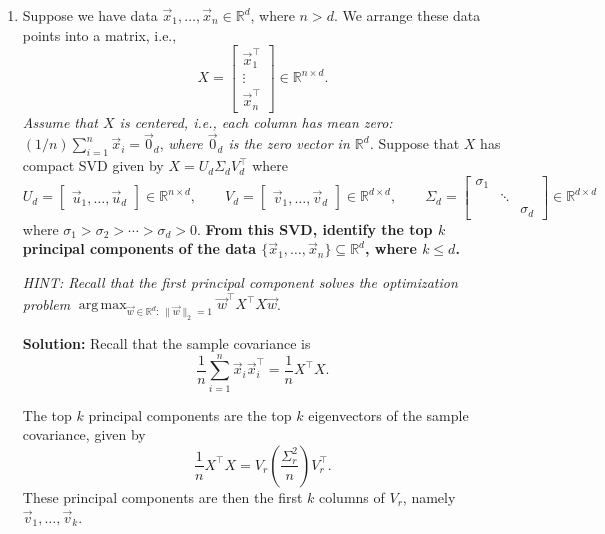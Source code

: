 \documentclass[10pt]{article}
\newcommand{\RR}{\mathbb{R}}
\DeclareMathOperator*{\argmax}{arg\,max}
\begin{document}
\begin{enumerate}[label=(\alph*)]
\item Suppose we have data $\vec{x}_1, \ldots, \vec{x}_n \in \RR^d$, where $n > d$. We arrange these data points into a matrix, i.e.,
\begin{equation}
X = \begin{bmatrix} \vec{x}_1^\top \\ \vdots \\ \vec{x}_n^\top \end{bmatrix} \in \RR^{n \times d}.
\end{equation}
\emph{Assume that $X$ is centered, i.e., each column has mean zero:} $(1/n) \sum_{i=1}^{n} \vec{x}_i = \vec{0}_d$, \emph{where $\vec{0}_d$ is the zero vector in $\RR^d$.} Suppose that $X$ has compact SVD given by $X = U_d \Sigma_d V_d^\top$ where
\begin{equation}
U_d = \begin{bmatrix} \vec{u}_1, \ldots, \vec{u}_d \end{bmatrix} \in \RR^{n \times d}, \qquad V_d = \begin{bmatrix} \vec{v}_1, \ldots, \vec{v}_d \end{bmatrix} \in \RR^{d \times d}, \qquad \Sigma_d = \begin{bmatrix} \sigma_1 & & \\ & \ddots & \\ & & \sigma_d \end{bmatrix} \in \RR^{d \times d}
\end{equation}
where $\sigma_1 > \sigma_2 > \cdots > \sigma_d > 0$. \textbf{From this SVD, identify the top $k$ principal components of the data $\{\vec{x}_1, \ldots, \vec{x}_n\} \subseteq \RR^d$, where $k \leq d$.}

\emph{HINT: Recall that the first principal component solves the optimization problem} $\displaystyle\argmax_{\vec{w} \in \RR^d :\, \|\vec{w}\|_2 = 1} \vec{w}^\top X^\top X \vec{w}$.

\textbf{Solution:} Recall that the sample covariance is
\begin{equation}
\frac{1}{n} \sum_{i=1}^{n} \vec{x}_i \vec{x}_i^\top = \frac{1}{n} X^\top X.
\end{equation}

The top $k$ principal components are the top $k$ eigenvectors of the sample covariance, given by
\begin{equation}
\frac{1}{n} X^\top X = V_r \left(\frac{\Sigma_r^2}{n}\right) V_r^\top.
\end{equation}
These principal components are then the first $k$ columns of $V_r$, namely $\vec{v}_1, \ldots, \vec{v}_k$.

\end{enumerate}
\end{document}
